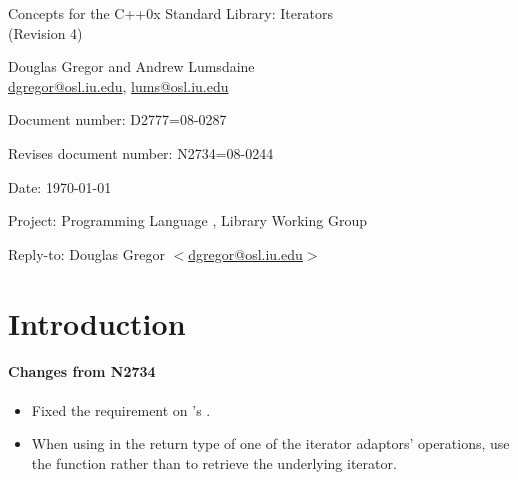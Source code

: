 \documentclass[american,twoside]{book}
\begin{document}
\raggedbottom

\begin{titlepage}
\begin{center}
\huge
Concepts for the C++0x Standard Library: Iterators \\
(Revision 4)
\vspace{0.5in}

\normalsize
Douglas Gregor and Andrew Lumsdaine \\
\href{mailto:dgregor@osl.iu.edu}{dgregor@osl.iu.edu}, \href{mailto:lums@osl.iu.edu}{lums@osl.iu.edu}
\end{center}

\vspace{1in}
\par\noindent Document number: D2777=08-0287 \vspace{-6pt}
\par\noindent Revises document number: N2734=08-0244 \vspace{-6pt}
\par\noindent Date: \today\vspace{-6pt}
\par\noindent Project: Programming Language \Cpp{}, Library Working Group\vspace{-6pt}
\par\noindent Reply-to: Douglas Gregor $<$\href{mailto:dgregor@osl.iu.edu}{dgregor@osl.iu.edu}$>$\vspace{-6pt}

\section*{Introduction}

\paragraph*{Changes from N2734}
\begin{itemize}
\item Fixed the  requirement on
  's .
\item When using  in the return type of one of the
  iterator adaptors'  operations, use the
   function rather than  to retrieve the
  underlying iterator.
\end{itemize}
\end{titlepage}

\pagestyle{fancy}
\fancyhead[LE,RO]{\textbf{\rightmark}}
\fancyhead[RE]{\textbf{\leftmark\hspace{1em}\thepage}}
\fancyhead[LO]{\textbf{\thepage\hspace{1em}\leftmark}}
\end{document}
